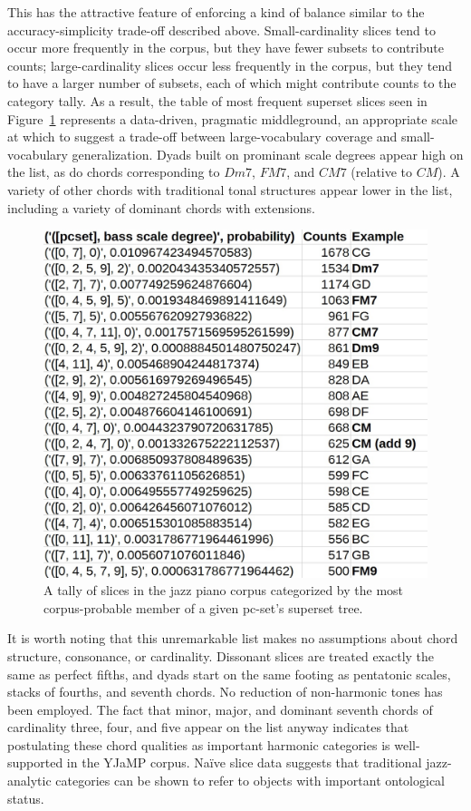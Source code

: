 This has the attractive feature of enforcing a kind of balance similar to the accuracy-simplicity trade-off described above.  Small-cardinality slices tend to occur more frequently in the corpus, but they have fewer subsets to contribute counts; large-cardinality slices occur less frequently in the corpus, but they tend to have a larger number of subsets, each of which might contribute counts to the category tally.  As a result, the table of most frequent superset slices seen in Figure~\ref{supersets} represents a data-driven, pragmatic middleground, an appropriate scale at which to suggest a trade-off between large-vocabulary coverage and small-vocabulary generalization.  Dyads built on prominant scale degrees appear high on the list, as do chords corresponding to $Dm7$, $FM7$, and $CM7$ (relative to $CM$).  A variety of other chords with traditional tonal structures appear lower in the list, including a variety of dominant chords with extensions.
\begin{figure}
	\centering
	\includegraphics[width=5in]{pc_slice_supersets.jpg}
	\caption{A tally of slices in the jazz piano corpus categorized by the most corpus-probable member of a given pc-set's superset tree.}
	\label{supersets}
\end{figure}

It is worth noting that this unremarkable list makes no assumptions about chord structure, consonance, or cardinality.  Dissonant slices are treated exactly the same as perfect fifths, and dyads start on the same footing as pentatonic scales, stacks of fourths, and seventh chords.  No reduction of non-harmonic tones has been employed.  The fact that minor, major, and dominant seventh chords of cardinality three, four, and five appear on the list anyway indicates that postulating these chord qualities as important harmonic categories is well-supported in the YJaMP corpus.  Na\"{i}ve slice data suggests that traditional jazz-analytic categories can be shown to refer to objects with important ontological status.

